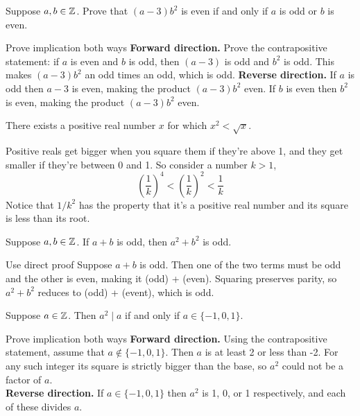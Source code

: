 \documentclass{article}
\begin{document}
\begin{problem}
Suppose $a,b \in \mathbb{Z}$. Prove that $(a-3)b^2$ is even if and only if $a$ is odd or $b$ is even.
\end{problem}
\begin{solution}{Prove implication both ways}
  \textbf{Forward direction.} Prove the contrapositive statement: if $a$ is even and $b$ is odd, then $(a-3)$ is odd and $b^2$ is odd. This makes $(a-3)b^2$ an odd times an odd, which is odd.
  \textbf{Reverse direction.} If $a$ is odd then $a - 3$ is even, making the product $(a-3)b^2$ even. If $b$ is even then $b^2$ is even, making the product $(a-3)b^2$ even.
\end{solution}

\begin{problem}
There exists a positive real number $x$ for which $x^2 < \sqrt{x}$.
\end{problem}
\begin{solution}{}
  Positive reals get bigger when you square them if they're above 1, and they get smaller if they're between 0 and 1. So consider a number $k > 1$,
  $$\left(\frac{1}{k}\right)^4 < \left(\frac{1}{k}\right)^2 < \frac{1}{k}$$
  Notice that $1/k^2$ has the property that it's a positive real number and its square is less than its root.
\end{solution}
\begin{problem}
Suppose $a, b \in \mathbb{Z}$. If $a+ b$ is odd, then $a^2 + b^2$ is odd.
\end{problem}
\begin{solution}{Use direct proof}
  Suppose $a + b$ is odd. Then one of the two terms must be odd and the other is even, making it (odd) + (even). Squaring preserves parity, so $a^2 + b^2$ reduces to (odd) + (event), which is odd.
\end{solution}

\begin{problem}
Suppose $a \in \mathbb{Z}$. Then $a^2 \mid a$ if and only if $a \in \{-1, 0, 1\}$.
\end{problem}
\begin{solution}{Prove implication both ways}
  \textbf{Forward direction.} Using the contrapositive statement, assume that $a \not\in \{-1, 0, 1\}$. Then $a$ is at least 2 or less than -2. For any such integer its square is strictly bigger than the base, so $a^2$ could not be a factor of $a$.
  \\

  \textbf{Reverse direction.} If $a \in \{-1, 0, 1\}$ then $a^2$ is 1, 0, or 1 respectively, and each of these divides $a$.

\end{solution}
\end{document}
